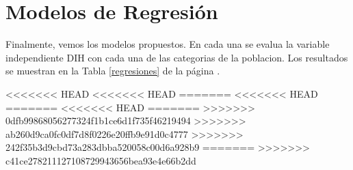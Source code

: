 \section{Modelos de Regresión}

Finalmente, vemos los modelos propuestos. En cada una se evalua la variable independiente DIH con cada una de las categorias de la poblacion. Los resultados se muestran en la Tabla \ref{regresiones} de la página \pageref{regresiones}.


<<<<<<< HEAD
<<<<<<< HEAD
=======
<<<<<<< HEAD
=======
<<<<<<< HEAD
=======
>>>>>>> 0dfb99868056277324f1b1ce6d1f735f46219494
>>>>>>> ab260d9ca0fc0df7d8f0226e20ffb9e91d0c4777
>>>>>>> 242f35b3d9cbd73a283dbba520058c00d6a928b9
=======
>>>>>>> c41ce278211127108729943656bea93e4e66b2dd
